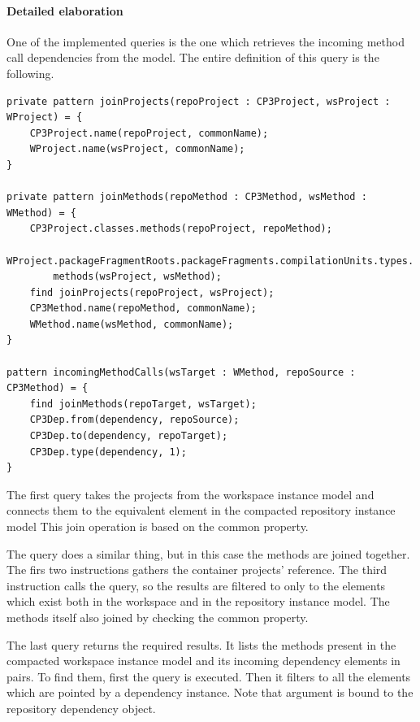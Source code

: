 \paragraph{Detailed elaboration}
One of the implemented queries is the one which retrieves the incoming method call 
dependencies from the model. The entire definition of this query is the following. 
\begin{lstlisting}[caption=Elements of the incoming method call dependency query]
private pattern joinProjects(repoProject : CP3Project, wsProject : WProject) = {
	CP3Project.name(repoProject, commonName);
	WProject.name(wsProject, commonName);
}

private pattern joinMethods(repoMethod : CP3Method, wsMethod : WMethod) = {
	CP3Project.classes.methods(repoProject, repoMethod);
	WProject.packageFragmentRoots.packageFragments.compilationUnits.types.
		methods(wsProject, wsMethod);
	find joinProjects(repoProject, wsProject);
	CP3Method.name(repoMethod, commonName);
	WMethod.name(wsMethod, commonName);
}

pattern incomingMethodCalls(wsTarget : WMethod, repoSource : CP3Method) = {
	find joinMethods(repoTarget, wsTarget);
	CP3Dep.from(dependency, repoSource);
	CP3Dep.to(dependency, repoTarget);
	CP3Dep.type(dependency, 1);
}
\end{lstlisting}

The first  query takes the projects from the workspace
instance model and connects them to the equivalent element in the compacted
repository instance model This join operation is based on the common 
property.

The  query does a similar thing, but in this case the methods
are joined together. The firs two instructions gathers the container projects'
reference. The third instruction calls the  query, so the 
results are filtered to only to the elements which exist both in the workspace
and in the repository instance model. The methods itself also joined by 
checking the common  property.

The last  query returns the required results. It lists
the methods present in the compacted workspace instance model and its incoming
dependency elements in pairs. To find them, first the  query
is executed. Then it filters to all the elements which are pointed by a
dependency instance. Note that  argument is bound to the
repository dependency object.

